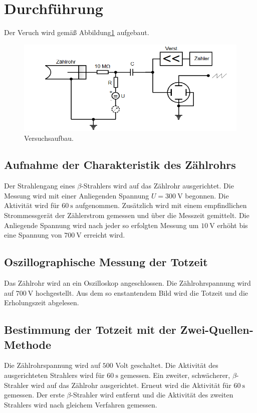 \section{Durchführung}
\label{sec:Durchführung}
Der Veruch wird gemäß Abbildung\ref{fig:aufb} aufgebaut.
\begin{figure}[H]
  \centering
  \includegraphics[scale=0.4]{content/Aufbau.png}
  \caption{Versuchsaufbau.}
  \label{fig:aufb}
\end{figure}

\subsection{Aufnahme der Charakteristik des Zählrohrs}
Der Strahlengang eines $\beta$-Strahlers wird auf das Zählrohr ausgerichtet.
Die Messung wird mit einer Anliegenden Spannung $U= \SI{300}{\volt}$ begonnen.
Die Aktivität wird für $\SI{60}{\second}$ aufgenommen.
Zusätzlich wird mit einem empfindlichen Strommessgerät der Zählerstrom gemessen und über die Messzeit gemittelt.
Die Anliegende Spannung wird nach jeder so erfolgten Messung um $\SI{10}{\volt}$ erhöht bis eine Spannung von $\SI{700}{\volt}$ erreicht wird.
\subsection{Oszillographische Messung der Totzeit}
Das Zählrohr wird an ein Oszilloskop angeschlossen.
Die Zählrohrspannung wird auf $\SI{700}{\volt}$ hochgestellt.
Aus dem so enstantendem Bild wird die Totzeit und die Erholungszeit abgelesen.
\subsection{Bestimmung der Totzeit mit der Zwei-Quellen-Methode}
Die Zählrohrspannung wird auf $500$ Volt geschaltet.
Die Aktivität des ausgerichteten Strahlers wird für $\SI{60}{\second}$ gemessen.
Ein zweiter, schwächerer, $\beta$-Strahler wird auf  das Zählrohr ausgerichtet.
Erneut wird die Aktivität für $\SI{60}{\second}$ gemessen.
Der erste $\beta$-Strahler wird entfernt und die Aktivität des zweiten Strahlers wird nach gleichem Verfahren gemessen.

